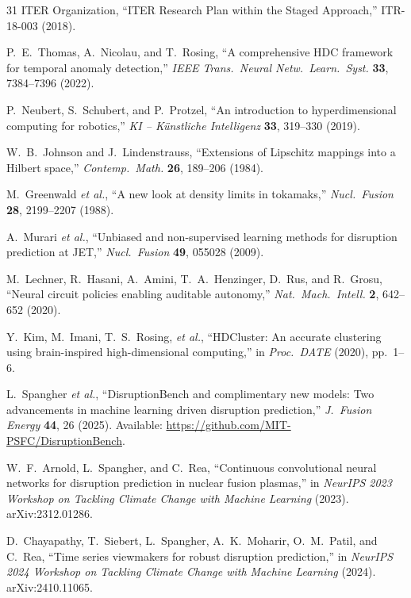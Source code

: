 \documentclass[twocolumn,prl,aps,superscriptaddress,floatfix]{revtex4-2}
\begin{document}
\begin{thebibliography}{31}
ITER Organization,
``ITER Research Plan within the Staged Approach,''
ITR-18-003 (2018).

P.~E.~Thomas, A.~Nicolau, and T.~Rosing,
``A comprehensive HDC framework for temporal anomaly detection,''
\textit{IEEE Trans.\ Neural Netw.\ Learn.\ Syst.} \textbf{33}, 7384--7396 (2022).

P.~Neubert, S.~Schubert, and P.~Protzel,
``An introduction to hyperdimensional computing for robotics,''
\textit{KI -- K\"unstliche Intelligenz} \textbf{33}, 319--330 (2019).

W.~B.~Johnson and J.~Lindenstrauss,
``Extensions of Lipschitz mappings into a Hilbert space,''
\textit{Contemp.\ Math.} \textbf{26}, 189--206 (1984).

M.~Greenwald \textit{et al.},
``A new look at density limits in tokamaks,''
\textit{Nucl.\ Fusion} \textbf{28}, 2199--2207 (1988).

A.~Murari \textit{et al.},
``Unbiased and non-supervised learning methods for disruption prediction at JET,''
\textit{Nucl.\ Fusion} \textbf{49}, 055028 (2009).

M.~Lechner, R.~Hasani, A.~Amini, T.~A.~Henzinger, D.~Rus, and R.~Grosu,
``Neural circuit policies enabling auditable autonomy,''
\textit{Nat.\ Mach.\ Intell.} \textbf{2}, 642--652 (2020).

Y.~Kim, M.~Imani, T.~S.~Rosing, \textit{et al.},
``HDCluster: An accurate clustering using brain-inspired high-dimensional computing,''
in \textit{Proc.\ DATE} (2020), pp.~1--6.

L.~Spangher \textit{et al.},
``DisruptionBench and complimentary new models: Two advancements in machine learning driven disruption prediction,''
\textit{J.\ Fusion Energy} \textbf{44}, 26 (2025).
Available: \url{https://github.com/MIT-PSFC/DisruptionBench}.

W.~F.~Arnold, L.~Spangher, and C.~Rea,
``Continuous convolutional neural networks for disruption prediction in nuclear fusion plasmas,''
in \textit{NeurIPS 2023 Workshop on Tackling Climate Change with Machine Learning} (2023).
arXiv:2312.01286.

D.~Chayapathy, T.~Siebert, L.~Spangher, A.~K.~Moharir, O.~M.~Patil, and C.~Rea,
``Time series viewmakers for robust disruption prediction,''
in \textit{NeurIPS 2024 Workshop on Tackling Climate Change with Machine Learning} (2024).
arXiv:2410.11065.

\end{thebibliography}
\end{document}
